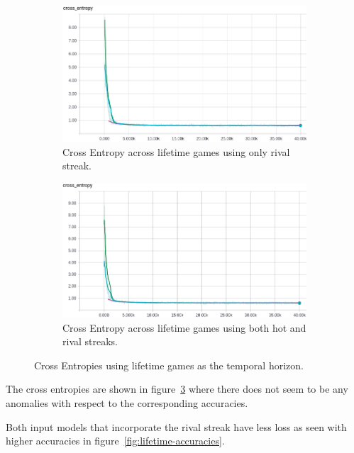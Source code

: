 \documentclass{article} %
\begin{document}
\begin{figure}[!htb]
  \begin{subfigure}{0.5\textwidth}
    \includegraphics[width=\linewidth]{plots/model1/lifetime/streak-r/crossentropy.png}
    \caption{Cross Entropy across lifetime games using only rival streak.}\label{fig:lifetime-r-crossentropy}
  \end{subfigure}
  \begin{subfigure}{0.5\textwidth}
    \includegraphics[width=\linewidth]{plots/model1/lifetime/streak-hr/crossentropy.png}
    \caption{Cross Entropy across lifetime games using both hot and rival streaks.}\label{fig:lifetime-hr-crossentropy}
  \end{subfigure}
  \caption{Cross Entropies using lifetime games as the temporal horizon.}
  \label{fig:lifetime-crossentropies}
\end{figure}

The cross entropies are shown in figure~\ref{fig:lifetime-crossentropies} where there does not seem to be any anomalies with respect to the corresponding accuracies.

Both input models that incorporate the rival streak have less loss as seen with higher accuracies in figure~\ref{fig:lifetime-accuracies}.
\end{document}
